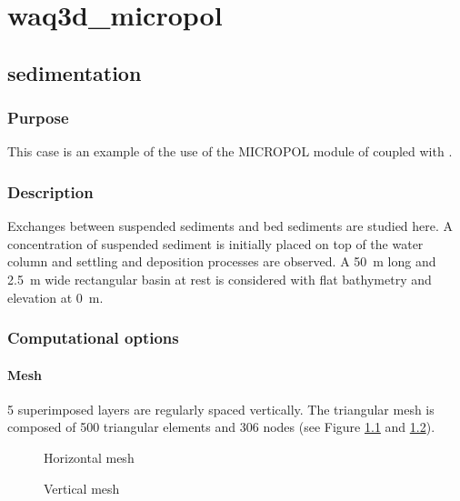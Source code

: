 \chapter{waq3d\_micropol}

\section{sedimentation}

\subsection{Purpose}

This case is an example of the use of the MICROPOL module of \waqtel
coupled with . 

\subsection{Description}

Exchanges between suspended sediments and bed sediments are studied here. A concentration of suspended sediment is initially placed on top of the water column and settling and deposition processes are observed.
A 50~m long and 2.5~m wide rectangular basin at rest is considered
with flat bathymetry and elevation at 0~m.

\subsection{Computational options}

\subsubsection{Mesh}
5 superimposed layers are regularly spaced vertically.
The triangular mesh is composed of 500 triangular elements and
306 nodes (see Figure \ref{fig:waq3d_micropol:mesh_sed} and \ref{fig:waq3d_micropol:mesh_sed_sec}).

\begin{figure}[H]
 \centering
\caption{Horizontal mesh}
 \label{fig:waq3d_micropol:mesh_sed}
\end{figure}

\begin{figure}[H]
 \centering
\caption{Vertical mesh}
 \label{fig:waq3d_micropol:mesh_sed_sec}
\end{figure}

